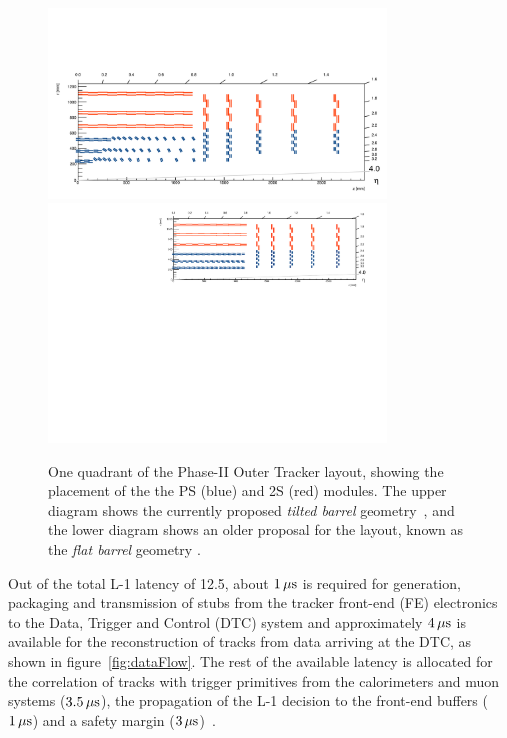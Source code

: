 \begin{figure}[tbp]
\centering
\includegraphics[width=0.8\textwidth,trim={1.1truecm 0truecm 1truecm 12truecm},clip]{figs/tk-upgrade/tiltedbarrelmap.pdf}
\includegraphics[width=0.8\textwidth,trim={0.7truecm 0truecm 1truecm 0truecm},clip]{figs/tk-upgrade/mersilayout.pdf}
\caption{One quadrant of the Phase-II Outer Tracker layout, showing the placement of the the PS (blue) and 2S (red) modules. The upper diagram shows the currently proposed \emph{tilted barrel} geometry~\cite{tiltedGeometry, P2TrackerTDR}, and the lower diagram shows an older proposal for the layout, known as the \emph{flat barrel} geometry \cite{CMS_Upgrade_TP}.}
\label{fig:trackerlayout}
\end{figure}

Out of the total L-1 latency of 12.5\mus, about $1\,\mu\text{s}$ is required for generation, packaging and transmission of stubs from the tracker front-end (FE) electronics to the Data, Trigger and Control (DTC) system and approximately $4\,\mu\text{s}$ is available for the reconstruction of tracks from data arriving at the DTC, as shown in figure~\ref{fig:dataFlow}.
The rest of the available latency is allocated for the correlation of tracks with trigger primitives from the calorimeters and muon systems ($3.5\,\mu\text{s}$), the propagation of the L-1 decision to the front-end buffers ($1\,\mu\text{s}$) and a safety margin ($3\,\mu\text{s}$)~\cite{CMS_Upgrade_TP}.

